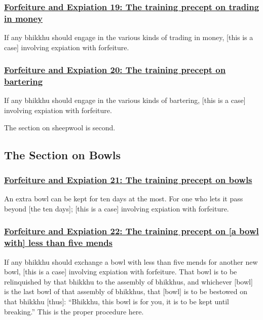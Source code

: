 \subsubsection*{\hyperref[np19]{Forfeiture and Expiation 19: The training precept on trading in money}}
\label{forf-exp19}
If any bhikkhu should engage in the various kinds of trading in money, [this is a case] involving expiation with forfeiture.

\subsubsection*{\hyperref[np20]{Forfeiture and Expiation 20: The training precept on bartering}}
\label{forf-exp20}
If any bhikkhu should engage in the various kinds of bartering, [this is a case] involving expiation with forfeiture. 

The section on sheepwool is second.

\setsubsecheadstyle{\subsectionFmt}
\subsection{The Section on Bowls}
\vspace{0.2cm}

\subsubsection*{\hyperref[np21]{Forfeiture and Expiation 21: The training precept on bowls}}
\label{forf-exp21}
An extra bowl can be kept for ten days at the most. For one who lets it pass beyond [the ten days]; [this is a case] involving expiation with forfeiture.

\subsubsection*{\hyperref[np22]{Forfeiture and Expiation 22: The training precept on [a bowl with] less than five mends}}
\label{forf-exp22}
If any bhikkhu should exchange a bowl with less than five mends for another new bowl, [this is a case] involving expiation with forfeiture. That bowl is to be relinquished by that bhikkhu to the assembly of bhikkhus, and whichever [bowl] is the last bowl of that assembly of bhikkhus, that [bowl] is to be bestowed on that bhikkhu [thus]: ``Bhikkhu, this bowl is for you, it is to be kept until breaking.'' This is the proper procedure here.

